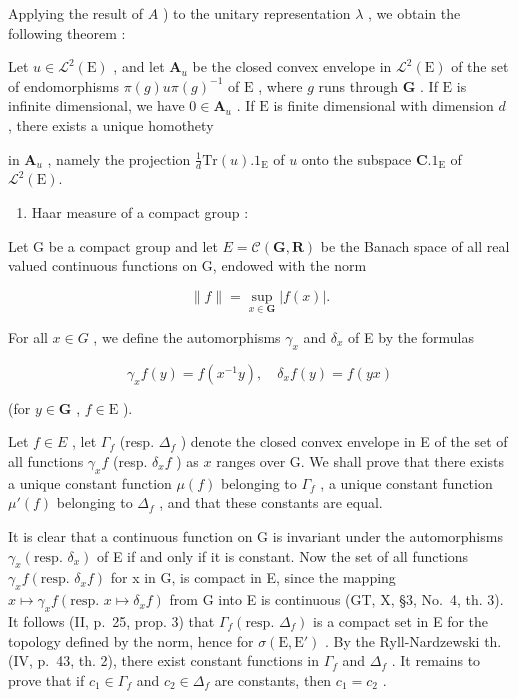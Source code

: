 Applying the result of \(A\) ) to the unitary representation \(\lambda\) , we obtain the following theorem :

Let \(u \in \mathcal{L}^2(\mathrm{E})\) , and let \(\mathbf{A}_u\) be the closed convex envelope in \(\mathcal{L}^2(\mathrm{E})\) of the set of endomorphisms \(\pi(g) u\pi(g)^{-1}\) of \(\mathrm{E}\) , where \(g\) runs through \(\mathbf{G}\) . If \(\mathrm{E}\) is infinite dimensional, we have \(0 \in \mathbf{A}_u\) . If \(\mathrm{E}\) is finite dimensional with dimension \(d\) , there exists a unique homothety

in \(\mathbf{A}_u\) , namely the projection \(\frac{1}{d}\mathrm{Tr}(u).1_{\mathrm{E}}\) of \(u\) onto the subspace \(\mathbf{C}.1_{\mathrm{E}}\) of \(\mathcal{L}^2 (\mathrm{E}).\)

\begin{enumerate}
\def\labelenumi{\Alph{enumi})}
\setcounter{enumi}{2}
\tightlist
\item
  Haar measure of a compact group :
\end{enumerate}

Let G be a compact group and let \(E = \mathcal{C}(\mathbf{G}, \mathbf{R})\) be the Banach space of all real valued continuous functions on G, endowed with the norm

\[
\| f \| = \sup _ {x \in \mathbf {G}} | f (x) |.\tag{4}
\]

For all \(x \in G\) , we define the automorphisms \(\gamma_{x}\) and \(\delta_{x}\) of E by the formulas

\[
\gamma_ {x} f (y) = f \left(x ^ {- 1} y\right), \quad \delta_ {x} f (y) = f (y x)\tag{5}
\]

(for \(y \in \mathbf{G}\) , \(f \in \mathrm{E}\) ).

Let \(f \in E\) , let \(\Gamma_f\) (resp. \(\Delta_f\) ) denote the closed convex envelope in E of the set of all functions \(\gamma_x f\) (resp. \(\delta_x f\) ) as \(x\) ranges over G. We shall prove that there exists a unique constant function \(\mu(f)\) belonging to \(\Gamma_f\) , a unique constant function \(\mu'(f)\) belonging to \(\Delta_f\) , and that these constants are equal.

It is clear that a continuous function on G is invariant under the automorphisms \(\gamma_{x}(\text{resp. } \delta_{x})\) of E if and only if it is constant. Now the set of all functions \(\gamma_{x}f(\text{resp. } \delta_{x}f)\) for x in G, is compact in E, since the mapping \(x \mapsto \gamma_{x}f(\text{resp. } x \mapsto \delta_{x}f)\) from G into E is continuous (GT, X, §3, No.~4, th. 3). It follows (II, p.~25, prop. 3) that \(\Gamma_{f}(\text{resp. } \Delta_{f})\) is a compact set in E for the topology defined by the norm, hence for \(\sigma(\text{E}, \text{E}')\) . By the Ryll-Nardzewski th. (IV, p.~43, th. 2), there exist constant functions in \(\Gamma_{f}\) and \(\Delta_{f}\) . It remains to prove that if \(c_{1} \in \Gamma_{f}\) and \(c_{2} \in \Delta_{f}\) are constants, then \(c_{1} = c_{2}\) .

